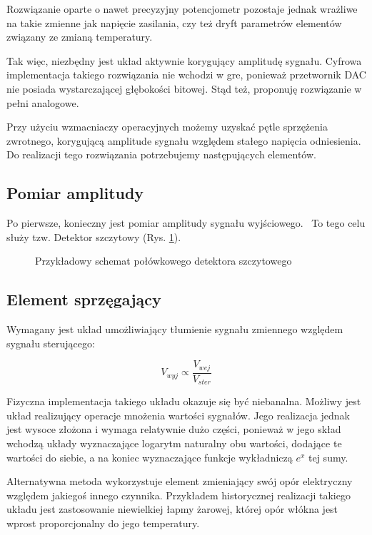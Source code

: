 \documentclass[12pt, a4paper]{article}
\begin{document}
Rozwiązanie oparte o nawet precyzyjny potencjometr pozostaje jednak wrażliwe na takie zmienne jak napięcie zasilania, 
czy też dryft parametrów elementów związany ze zmianą temperatury.

Tak więc, niezbędny jest układ aktywnie korygujący amplitudę sygnału.
Cyfrowa implementacja takiego rozwiązania nie wchodzi w gre, 
ponieważ przetwornik DAC nie posiada wystarczającej głębokości bitowej. 
Stąd też, proponuję rozwiązanie w pełni analogowe.

Przy użyciu wzmacniaczy operacyjnych możemy uzyskać pętle sprzężenia zwrotnego, 
korygującą amplitude sygnału względem stałego napięcia odniesienia.
Do realizacji tego rozwiązania potrzebujemy następujących elementów.

\subsection{Pomiar amplitudy}

Po pierwsze, konieczny jest pomiar amplitudy sygnału wyjściowego. \
To tego celu służy tzw. Detektor szczytowy (Rys. \ref{fig:peak-detector-schematic}). 

\begin{figure}[h]
	\centering
	
	\caption{Przykładowy schemat połówkowego detektora szczytowego}
	\label{fig:peak-detector-schematic}
\end{figure}

\subsection{Element sprzęgający}
Wymagany jest układ umożliwiający tłumienie sygnału zmiennego względem sygnału sterującego:

\begin{equation}
	V_{wyj} \propto \frac{V_{wej}}{V_{ster}}
	\label{eq:coupling_1}
\end{equation}

Fizyczna implementacja takiego układu okazuje się być niebanalna.
Możliwy jest układ realizujący operacje mnożenia wartości sygnałów. 
Jego realizacja jednak jest wysoce złożona i wymaga relatywnie dużo części, 
ponieważ w jego skład wchodzą układy wyznaczające logarytm naturalny obu wartości, dodające te wartości do siebie,
a na koniec wyznaczające funkcje wykładniczą $e^x$ tej sumy.

Alternatywna metoda wykorzystuje element zmieniający swój opór elektryczny względem jakiegoś innego czynnika.
Przykładem historycznej realizacji takiego układu jest zastosowanie niewielkiej łapmy żarowej,
której opór włókna jest wprost proporcjonalny do jego temperatury.
\end{document}
